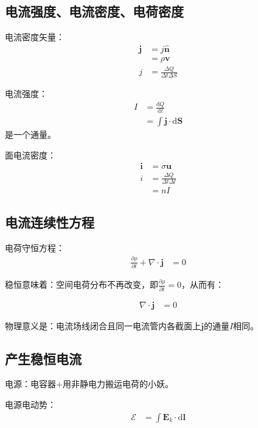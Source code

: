 \documentclass[12pt,onecolumn,a4paper]{book}
\numberwithin{table}{subsection}
\numberwithin{equation}{subsection}
\begin{document}
\subsection{电流强度、电流密度、电荷密度}

电流密度矢量：
\begin{align}
    \mathbf{j} & = j \hat{\mathbf{n}}                 \\
               & = \rho \mathbf{v}                    \\
    j          & = \frac{\Delta Q}{\Delta t \Delta S}
\end{align}


电流强度：
\begin{align}
    I & = \frac{\mathrm{d} Q}{\mathrm{d} t}           \\
      & = \int \mathbf{j} \cdot \mathrm{d} \mathbf{S}
\end{align}
是一个通量。

面电流密度：
\begin{align}
    \mathbf{i} & = \sigma \mathbf{u}                 \\
    i          & = \frac{\Delta Q}{\Delta t\Delta l} \\
               & = n I
\end{align}

\subsection{电流连续性方程}

电荷守恒方程：
\begin{align}
    \frac{\partial \rho}{\partial t} + \nabla \cdot \mathbf{j} & = 0
\end{align}

稳恒意味着：空间电荷分布不再改变，即$\frac{\partial \rho}{\partial t} = 0$，从而有：

\begin{align}
    \nabla \cdot \mathbf{j} & = 0
\end{align}

物理意义是：电流场线闭合且同一电流管内各截面上$\mathbf{j}$的通量$I$相同。

\subsection{产生稳恒电流}

电源：电容器+用非静电力搬运电荷的小妖。

电源电动势：
\begin{align}
    \mathcal{E} & = \int \mathbf{E}_k \cdot \mathrm{d} \mathbf{l}
\end{align}
\end{document}
